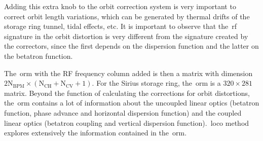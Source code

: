 Adding this extra knob to the orbit correction system is very important to correct orbit length variations, which can be generated by thermal drifts of the storage ring tunnel, tidal effects, etc. It is important to observe that the~\gls{rf} signature in the orbit distortion is very different from the signature created by the correctors, since the first depends on the dispersion function and the latter on the betatron function.

The~\gls{orm} with the RF frequency column added is then a matrix with dimension $2 \mathrm{N}_{\mathrm{BPM}} \times \left(\mathrm{N}_{\mathrm{CH}} + \mathrm{N}_{\mathrm{CV}}+1\right)$. For the Sirius storage ring, the~\gls{orm} is a $320 \times 281$ matrix. Beyond the function of calculating the corrections for orbit distortions, the~\gls{orm} contains a lot of information about the uncoupled linear optics (betatron function, phase advance and horizontal dispersion function) and the coupled linear optics (betatron coupling and vertical dispersion function).~\gls{loco} method explores extensively the information contained in the~\gls{orm}.



